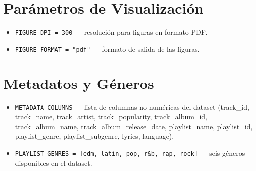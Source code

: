 \section{Parámetros de Visualización}

\begin{itemize}[leftmargin=2em]
    \item \texttt{FIGURE\_DPI = 300} --- resolución para figuras en formato PDF.
    \item \texttt{FIGURE\_FORMAT = "pdf"} --- formato de salida de las figuras.
\end{itemize}

\section{Metadatos y Géneros}

\begin{itemize}[leftmargin=2em]
    \item \texttt{METADATA\_COLUMNS} --- lista de columnas no numéricas del dataset (track\_id, track\_name, track\_artist, track\_popularity, track\_album\_id, track\_album\_name, track\_album\_release\_date, playlist\_name, playlist\_id, playlist\_genre, playlist\_subgenre, lyrics, language).
    \item \texttt{PLAYLIST\_GENRES = [edm, latin, pop, r\&b, rap, rock]} --- seis géneros disponibles en el dataset.
\end{itemize}
